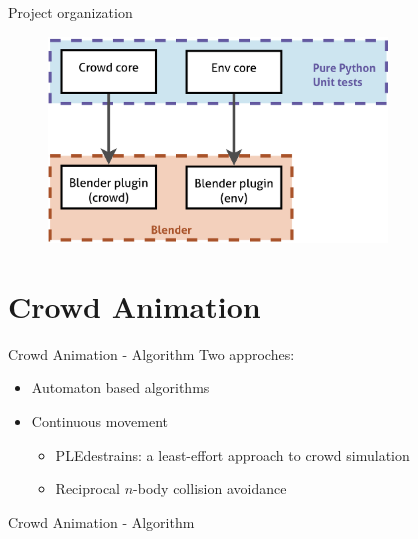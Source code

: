 \documentclass{beamer}
\begin{document}
\begin{frame}{Project organization}
  \begin{figure}
    \begin{center}
      \includegraphics[width=9cm]{orga.pdf}
    \end{center}
  \end{figure}
\end{frame}


\section{Crowd Animation}

\begin{frame}{Crowd Animation - Algorithm}
 	Two approches:
 \begin{itemize}
  \item Automaton based algorithms
  \item Continuous movement
  \begin{itemize}
  \item PLEdestrains: a least-effort approach to crowd simulation
  \item Reciprocal $n$-body collision avoidance
 \end{itemize}
 \end{itemize}
 
\end{frame}

\begin{frame}{Crowd Animation - Algorithm}





   
\end{frame}
\end{document}
